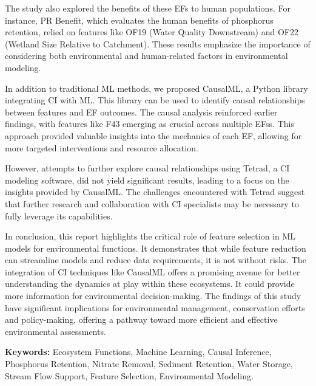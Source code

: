 \documentclass[12pt,letterpaper]{article}
\begin{document}
The study also explored the benefits of these \acp{EF} to human populations.
For instance, \ac{PR} Benefit, which evaluates the human benefits of phosphorus retention, relied on features like OF19 (Water Quality Downstream) and OF22 (Wetland Size Relative to Catchment).
These results emphasize the importance of considering both environmental and human-related factors in environmental modeling.

In addition to traditional \ac{ML} methods, we proposed CausalML, a Python library integrating \ac{CI} with \ac{ML}.
This library can be used to identify causal relationships between features and \ac{EF} outcomes.
The causal analysis reinforced earlier findings, with features like F43 emerging as crucial across multiple \acp{EF}s.
This approach provided valuable insights into the mechanics of each \ac{EF}, allowing for more targeted interventions and resource allocation.

However, attempts to further explore causal relationships using Tetrad, a \ac{CI} modeling software, did not yield significant results, leading to a focus on the insights provided by CausalML.
The challenges encountered with Tetrad suggest that further research and collaboration with \ac{CI} specialists may be necessary to fully leverage its capabilities.

In conclusion, this report highlights the critical role of feature selection in \ac{ML} models for environmental functions.
It demonstrates that while feature reduction can streamline models and reduce data requirements, it is not without risks.
The integration of \ac{CI} techniques like CausalML offers a promising avenue for better understanding the dynamics at play within these ecosystems.
It could provide more information for environmental decision-making.
The findings of this study have significant implications for environmental management, conservation efforts and policy-making, offering a pathway toward more efficient and effective environmental assessments.

\noindent\textbf{Keywords:} Ecosystem Functions, Machine Learning, Causal Inference, Phosphorus Retention, Nitrate Removal, Sediment Retention, Water Storage, Stream Flow Support, Feature Selection, Environmental Modeling.



\printglossaries

\clearpage
\end{document}
